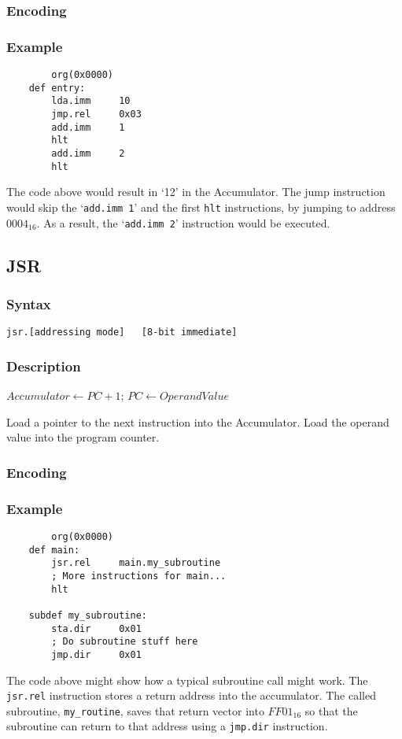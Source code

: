     \subsubsection{Encoding}

    \subsubsection{Example}
    \begin{verbatim}
        org(0x0000)
    def entry:
        lda.imm     10
        jmp.rel     0x03
        add.imm     1
        hlt
        add.imm     2
        hlt
    \end{verbatim}
    \par The code above would result in `12' in the Accumulator.
    The jump instruction would skip the `\texttt{add.imm 1}'  and  the first \texttt{hlt} instructions, by jumping to address $0004_{16}$.
    As a result, the `\texttt{add.imm 2}' instruction would be executed.

\pagebreak
\subsection{JSR}\label{subsec:jsr}
    \subsubsection{Syntax}
    \begin{verbatim}jsr.[addressing mode]   [8-bit immediate]\end{verbatim}
    \subsubsection{Description}
    $Accumulator \leftarrow PC + 1$; $PC \leftarrow OperandValue$
    \par Load a pointer to the next instruction into the Accumulator.
    Load the operand value into the program counter.
    \subsubsection{Encoding}

    \subsubsection{Example}
    \begin{verbatim}
        org(0x0000)
    def main:
        jsr.rel     main.my_subroutine
        ; More instructions for main...
        hlt

    subdef my_subroutine:
        sta.dir     0x01
        ; Do subroutine stuff here
        jmp.dir     0x01
    \end{verbatim}
    \par The code above might show how a typical subroutine call might work.
    The \texttt{jsr.rel} instruction stores a return address into the accumulator.
    The called subroutine, \texttt{my\_routine}, saves that return vector into $FF01_{16}$
    so that the subroutine can return to that address using a \texttt{jmp.dir} instruction.

